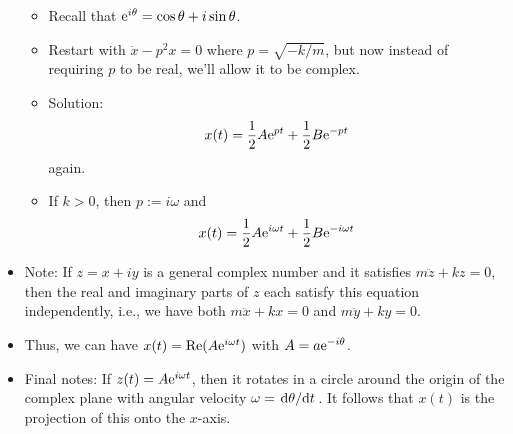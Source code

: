 \documentclass[../notes.tex]{subfiles}
\begin{document}
\begin{itemize}
    \begin{itemize}
        \item Recall that $\e[i\theta]=\cos\theta+i\sin\theta$.
        \item Restart with $\ddot{x}-p^2x=0$ where $p=\sqrt{-k/m}$, but now instead of requiring $p$ to be real, we'll allow it to be complex.
        \item Solution:
        \begin{equation*}
            x(t) = \frac{1}{2}A\e[pt]+\frac{1}{2}B\e[-pt]
        \end{equation*}
        again.
        \item If $k>0$, then $p:=i\omega$ and
        \begin{equation*}
            x(t) = \frac{1}{2}A\e[i\omega t]+\frac{1}{2}B\e[-i\omega t]
        \end{equation*}
    \end{itemize}
    \item Note: If $z=x+iy$ is a general complex number and it satisfies $m\ddot{z}+kz=0$, then the real and imaginary parts of $z$ each satisfy this equation independently, i.e., we have both $m\ddot{x}+kx=0$ and $m\ddot{y}+ky=0$.
    \item Thus, we can have $x(t)=\re(A\e[i\omega t])$ with $A=a\e[-i\theta]$.
    \item Final notes: If $z(t)=A\e[i\omega t]$, then it rotates in a circle around the origin of the complex plane with angular velocity $\omega=\dv*{\theta}{t}$. It follows that $x(t)$ is the projection of this onto the $x$-axis.
\end{itemize}
\end{document}
